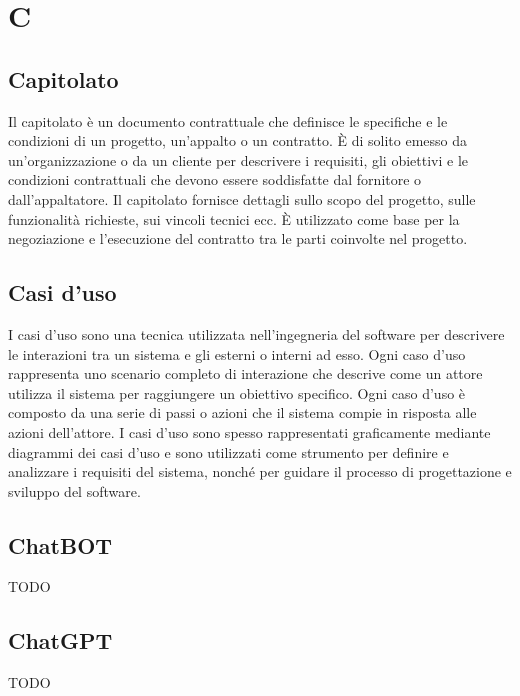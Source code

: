 \section{C}


\vspace{2em}
\subsection*{Capitolato}
Il capitolato è un documento contrattuale che definisce le specifiche e le condizioni di un progetto, un'appalto o un contratto. È di solito emesso da un'organizzazione o da un cliente per descrivere i requisiti, gli obiettivi e le condizioni contrattuali che devono essere soddisfatte dal fornitore o dall'appaltatore. Il capitolato fornisce dettagli sullo scopo del progetto, sulle funzionalità richieste, sui vincoli tecnici ecc. È utilizzato come base per la negoziazione e l'esecuzione del contratto tra le parti coinvolte nel progetto.


\vspace{2em}
\subsection*{Casi d'uso}
I casi d'uso sono una tecnica utilizzata nell'ingegneria del software per descrivere le interazioni tra un sistema e gli  esterni o interni ad esso. Ogni caso d'uso rappresenta uno scenario completo di interazione che descrive come un attore utilizza il sistema per raggiungere un obiettivo specifico. Ogni caso d'uso è composto da una serie di passi o azioni che il sistema compie in risposta alle azioni dell'attore. I casi d'uso sono spesso rappresentati graficamente mediante diagrammi dei casi d'uso e sono utilizzati come strumento per definire e analizzare i requisiti del sistema, nonché per guidare il processo di progettazione e sviluppo del software.

\vspace{2em}
\subsection*{ChatBOT}
TODO

\vspace{2em}
\subsection*{ChatGPT}
TODO

\vspace{2em}
